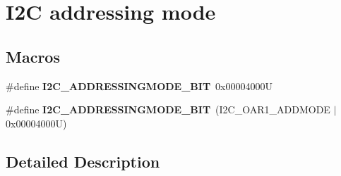 \hypertarget{group___i2_c__addressing__mode}{}\section{I2C addressing mode}
\label{group___i2_c__addressing__mode}
\subsection*{Macros}
\begin{DoxyCompactItemize}
\item 
\mbox{\label{group___i2_c__addressing__mode_ga28cf3b277595ac15edf383c2574ed18d}} 
\#define {\bfseries I2\+C\+\_\+\+A\+D\+D\+R\+E\+S\+S\+I\+N\+G\+M\+O\+D\+E\+\_\+B\+IT}~0x00004000U
\item 
\mbox{\label{group___i2_c__addressing__mode_ga2401dc32e64cd53290497bab73c3608d}} 
\#define {\bfseries I2\+C\+\_\+\+A\+D\+D\+R\+E\+S\+S\+I\+N\+G\+M\+O\+D\+E\+\_\+B\+IT}~(I2\+C\+\_\+\+O\+A\+R1\+\_\+\+A\+D\+D\+M\+O\+DE $\vert$ 0x00004000\+U)
\end{DoxyCompactItemize}


\subsection{Detailed Description}
